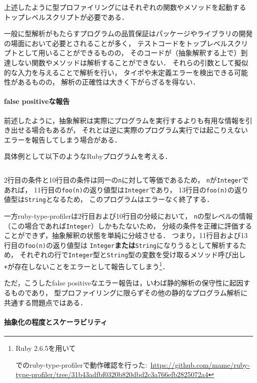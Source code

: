 上述したように型プロファイリングにはそれぞれの関数やメソッドを起動する
トップレベルスクリプトが必要である．

一般に型解析がもたらすプログラムの品質保証はパッケージやライブラリの開発の場面において必要とされることが多く，
テストコードをトップレベルスクリプトとして用いることができるものの，
そのコードが（抽象解釈する上で）到達しない関数やメソッドは解析することができない．
それらの引数として擬似的な入力を与えることで解析を行い，
タイポや未定義エラーを検出できる可能性があるものの，
解析の正確性は大きく下がらざるを得ない．

\paragraph{false positiveな報告}

前述したように，抽象解釈は実際にプログラムを実行するよりも有用な情報を引き出せる場合もあるが，
それとは逆に実際のプログラム実行では起こりえないエラーを報告してしまう場合がある．

具体例として以下のようなRubyプログラムを考える．

\inputminted[frame=lines, linenos]{ruby}{src/false_positive.rb}

2行目の条件と10行目の条件は同一の\verb|n|に対して等価であるため，
\verb|n|が\verb|Integer|であれば，
11行目の\verb|foo(n)|の返り値型は\verb|Integer|であり，
13行目の\verb|foo(n)|の返り値型は\verb|String|となるため，
このプログラムはエラーなく終了する．

一方ruby-type-profilerは2行目および10行目の分岐において，
\verb|n|の型レベルの情報（この場合であれば\verb|Integer|）しかもたないため，
分岐の条件を正確に評価することができず，抽象解釈の状態を単純に分岐させる．
つまり，11行目および13行目の\verb|foo(n)|の返り値型は
\verb|Integer|\textbf{または}\verb|String|になりうるとして解析するため，
それぞれの行で\verb|Integer|型と\verb|String|型の変数を受け取るメソッド呼び出し
\verb|+|が存在しないことをエラーとして報告してしまう\footnote{
  Ruby 2.6.5を用いて\date{\today}でのruby-type-profilerで動作確認を行った:\
  \url{https://github.com/mame/ruby-type-profiler/tree/31b43adfbf0320b820dbd2c3a766efb2825072a4}
}．

ただ，こうしたfalse positiveなエラー報告は，いわば静的解析の保守性に起因するものであり，
型プロファイリングに限らずその他の静的なプログラム解析に共通する問題点ではある．

\paragraph{抽象化の程度とスケーラビリティ}

